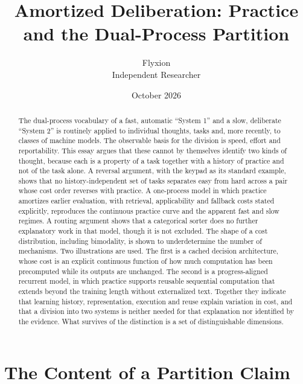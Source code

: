 \documentclass[11pt]{article}
\title{Amortized Deliberation: Practice and the Dual-Process Partition}
\author{Flyxion\\Independent Researcher}
\date{October 2026}
\theoremstyle{definition}
\begin{document}
\maketitle

\begin{abstract}
\noindent The dual-process vocabulary of a fast, automatic ``System 1'' and a slow, deliberate ``System 2'' is routinely applied to individual thoughts, tasks and, more recently, to classes of machine models. The observable basis for the division is speed, effort and reportability. This essay argues that these cannot by themselves identify two kinds of thought, because each is a property of a task together with a history of practice and not of the task alone. A reversal argument, with the keypad as its standard example, shows that no history-independent set of tasks separates easy from hard across a pair whose cost order reverses with practice. A one-process model in which practice amortizes earlier evaluation, with retrieval, applicability and fallback costs stated explicitly, reproduces the continuous practice curve and the apparent fast and slow regimes. A routing argument shows that a categorical sorter does no further explanatory work in that model, though it is not excluded. The shape of a cost distribution, including bimodality, is shown to underdetermine the number of mechanisms. Two illustrations are used. The first is a cached decision architecture, whose cost is an explicit continuous function of how much computation has been precomputed while its outputs are unchanged. The second is a progress-aligned recurrent model, in which practice supports reusable sequential computation that extends beyond the training length without externalized text. Together they indicate that learning history, representation, execution and reuse explain variation in cost, and that a division into two systems is neither needed for that explanation nor identified by the evidence. What survives of the distinction is a set of distinguishable dimensions.
\end{abstract}

\section{The Content of a Partition Claim}
\end{document}
